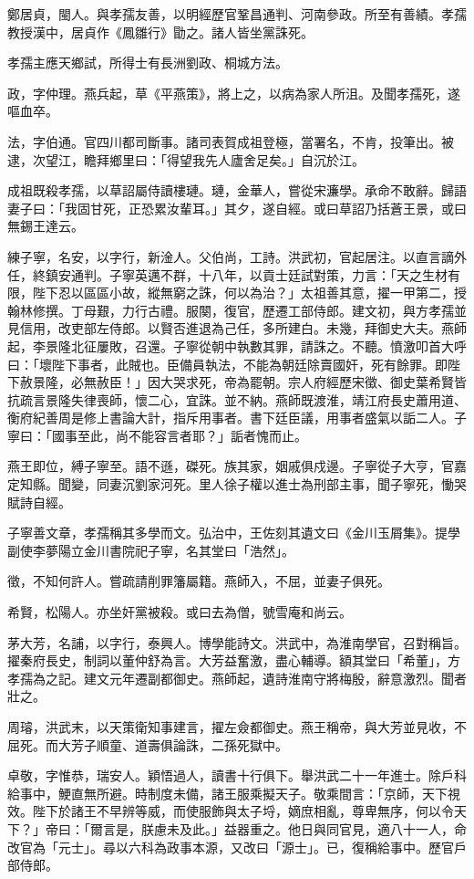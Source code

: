 \begin{pinyinscope}
鄭居貞，閩人。與孝孺友善，以明經歷官鞏昌通判、河南參政。所至有善績。孝孺教授漢中，居貞作《鳳雛行》勖之。諸人皆坐黨誅死。

孝孺主應天鄉試，所得士有長洲劉政、桐城方法。

政，字仲理。燕兵起，草《平燕策》，將上之，以病為家人所沮。及聞孝孺死，遂嘔血卒。

法，字伯通。官四川都司斷事。諸司表賀成祖登極，當署名，不肯，投筆出。被逮，次望江，瞻拜鄉里曰：「得望我先人廬舍足矣。」自沉於江。

成祖既殺孝孺，以草詔屬侍讀樓璉。璉，金華人，嘗從宋濂學。承命不敢辭。歸語妻子曰：「我固甘死，正恐累汝輩耳。」其夕，遂自經。或曰草詔乃括蒼王景，或曰無錫王達云。

練子寧，名安，以字行，新淦人。父伯尚，工詩。洪武初，官起居注。以直言謫外任，終鎮安通判。子寧英邁不群，十八年，以貢士廷試對策，力言：「天之生材有限，陛下忍以區區小故，縱無窮之誅，何以為治？」太祖善其意，擢一甲第二，授翰林修撰。丁母艱，力行古禮。服闋，復官，歷遷工部侍郎。建文初，與方孝孺並見信用，改吏部左侍郎。以賢否進退為己任，多所建白。未幾，拜御史大夫。燕師起，李景隆北征屢敗，召還。子寧從朝中執數其罪，請誅之。不聽。憤激叩首大呼曰：「壞陛下事者，此賊也。臣備員執法，不能為朝廷除賣國奸，死有餘罪。即陛下赦景隆，必無赦臣！」因大哭求死，帝為罷朝。宗人府經歷宋徵、御史葉希賢皆抗疏言景隆失律喪師，懷二心，宜誅。並不納。燕師既渡淮，靖江府長史蕭用道、衡府紀善周是修上書論大計，指斥用事者。書下廷臣議，用事者盛氣以詬二人。子寧曰：「國事至此，尚不能容言者耶？」詬者愧而止。

燕王即位，縛子寧至。語不遜，磔死。族其家，姻戚俱戍邊。子寧從子大亨，官嘉定知縣。聞變，同妻沉劉家河死。里人徐子權以進士為刑部主事，聞子寧死，慟哭賦詩自經。

子寧善文章，孝孺稱其多學而文。弘治中，王佐刻其遺文曰《金川玉屑集》。提學副使李夢陽立金川書院祀子寧，名其堂曰「浩然」。

徵，不知何許人。嘗疏請削罪籓屬籍。燕師入，不屈，並妻子俱死。

希賢，松陽人。亦坐奸黨被殺。或曰去為僧，號雪庵和尚云。

茅大芳，名誧，以字行，泰興人。博學能詩文。洪武中，為淮南學官，召對稱旨。擢秦府長史，制詞以董仲舒為言。大芳益奮激，盡心輔導。額其堂曰「希董」，方孝孺為之記。建文元年遷副都御史。燕師起，遺詩淮南守將梅殷，辭意激烈。聞者壯之。

周璿，洪武末，以天策衛知事建言，擢左僉都御史。燕王稱帝，與大芳並見收，不屈死。而大芳子順童、道壽俱論誅，二孫死獄中。

卓敬，字惟恭，瑞安人。穎悟過人，讀書十行俱下。舉洪武二十一年進士。除戶科給事中，鯁直無所避。時制度未備，諸王服乘擬天子。敬乘間言：「京師，天下視效。陛下於諸王不早辨等威，而使服飾與太子埒，嫡庶相亂，尊卑無序，何以令天下？」帝曰：「爾言是，朕慮未及此。」益器重之。他日與同官見，適八十一人，命改官為「元士」。尋以六科為政事本源，又改曰「源士」。已，復稱給事中。歷官戶部侍郎。


\end{pinyinscope}
